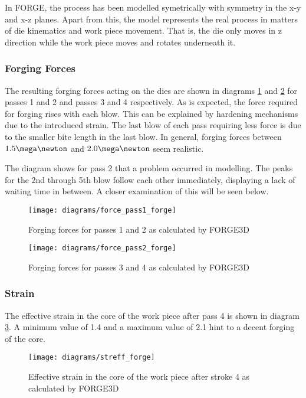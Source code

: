 In FORGE, the process has been modelled symetrically with symmetry in the x-y and x-z planes. Apart from this, the model represents the real process in matters of die kinematics and work piece movement. That is, the die only moves in z direction while the work piece moves and rotates underneath it.

\subsubsection{Forging Forces}

The resulting forging forces acting on the dies are shown in diagrams \ref{img:forgforce_forge_p1} and \ref{img:forgforce_forge_p2} for passes 1 and 2 and passes 3 and 4 respectively. As is expected, the force required for forging rises with each blow. This can be explained by hardening mechanisms due to the introduced strain. The last blow of each pass requiring less force is due to the smaller bite length in the last blow. In general, forging forces between $1.5\mega\newton$ and $2.0\mega\newton$ seem realistic.

The diagram shows for pass 2 that a problem occurred in modelling. The peaks for the 2nd through 5th blow follow each other immediately, displaying a lack of waiting time in between. A closer examination of this will be seen below.

\begin{figure}[htbp]
  \centering
  \texttt{[image: diagrams/force\_pass1\_forge]}
  \caption{Forging forces for passes 1 and 2 as calculated by FORGE3D}
  \label{img:forgforce_forge_p1}
\end{figure}

\begin{figure}[htbp]
  \centering
  \texttt{[image: diagrams/force\_pass2\_forge]}
  \caption{Forging forces for passes 3 and 4 as calculated by FORGE3D}
  \label{img:forgforce_forge_p2}
\end{figure}

\subsubsection{Strain}

The effective strain in the core of the work piece after pass 4 is shown in diagram \ref{img:streff_forge}. A minimum value of 1.4 and a maximum value of 2.1 hint to a decent forging of the core.

\begin{figure}[htbp]
  \centering
  \texttt{[image: diagrams/streff\_forge]}
  \caption{Effective strain in the core of the work piece after stroke 4 as calculated by FORGE3D}
  \label{img:streff_forge}
\end{figure}

